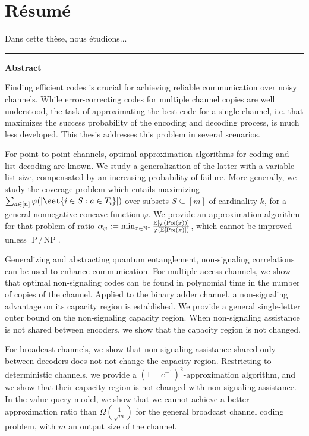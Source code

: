\chapter*{Résumé}

\begin{otherlanguage}{french}
  Dans cette thèse, nous étudions...
\end{otherlanguage}
\clearpage

\flushright
\bigskip
\hrule \bigskip \bigskip
{\Huge \textbf{\textsf{Abstract}}}
\flushleftright
{}
\vspace{1.5cm}

Finding efficient codes is crucial for achieving reliable communication over noisy channels. While error-correcting codes for multiple channel copies are well understood, the task of approximating the best code for a single channel, i.e. that maximizes the success probability of the encoding and decoding process, is much less developed. This thesis addresses this problem in several scenarios.

For point-to-point channels, optimal approximation algorithms for coding and list-decoding are known. We study a generalization of the latter with a variable list size, compensated by an increasing probability of failure. More generally, we study the coverage problem which entails maximizing $\sum_{a \in [n]}  \varphi(\abs{\set{i \in S : a \in T_i}})$ over subsets $S \subseteq [m]$ of cardinality $k$, for a general nonnegative concave function $\varphi$. We provide an approximation algorithm for that problem of ratio $\alpha_{\varphi} := \min_{x \in \mathbb{N}^*} \frac{\mathbb{E}[\varphi(\operatorname{\text{Poi}}(x))]}{\varphi(\mathbb{E}[\operatorname{\text{Poi}}(x)])}$, which cannot be improved unless $\textrm{P}\not=\textrm{NP}$.

Generalizing and abstracting quantum entanglement, non-signaling correlations can be used to enhance communication. For multiple-access channels, we show that optimal non-signaling codes can be found in polynomial time in the number of copies of the channel. Applied to the binary adder channel, a non-signaling advantage on its capacity region is established. We provide a general single-letter outer bound on the non-signaling capacity region. When non-signaling assistance is not shared between encoders, we show that the capacity region is not changed.

For broadcast channels, we show that non-signaling assistance shared only between decoders does not not change the capacity region. Restricting to deterministic channels, we provide a $(1-e^{-1})^2$-approximation algorithm, and we show that their capacity region is not changed with non-signaling assistance. In the value query model, we show that we cannot achieve a better approximation ratio than $\Omega\left(\frac{1}{\sqrt{m}}\right)$ for the general broadcast channel coding problem, with $m$ an output size of the channel.

